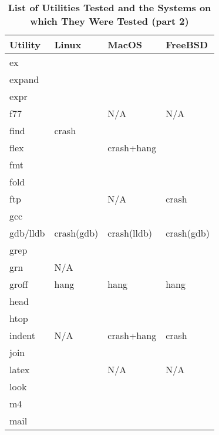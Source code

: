 \begin{table}[htbp]  %
\renewcommand\thetable{1}
\centering  %
 \begin{tabular}{|p{2.5cm}|p{2cm}|p{2cm}|p{2cm}|}  
     \hline
     \hline
        Utility & Linux & MacOS & FreeBSD \\ %
       \hline
       ex &   &   &    \\
       expand &   &   &    \\
       expr &   &   &    \\
       f77 &   & N/A  & N/A   \\
       find & crash  &   &    \\
       flex &   & crash+hang  &    \\
       fmt &   &   &    \\
       fold &   &   &    \\
       ftp &   & N/A  &  crash  \\
       gcc &   &   &    \\
       gdb/lldb & crash(gdb)  & crash(lldb)  &  crash(gdb)  \\
       grep &   &   &    \\
       grn & N/A  &   &    \\
       groff & hang  & hang  &  hang  \\
       head &   &   &    \\
       htop &   &   &    \\
       indent & N/A  & crash+hang  & crash   \\
       join &   &   &    \\
       latex &   & N/A  &  N/A  \\
       look &   &   &    \\
       m4 &   &   &    \\
       mail &   &   &    \\
       \hline
       \hline
   \end{tabular}
   \caption{\textbf{List of Utilities Tested and the Systems on which They Were Tested (part 2)}}  %
\end{table}



